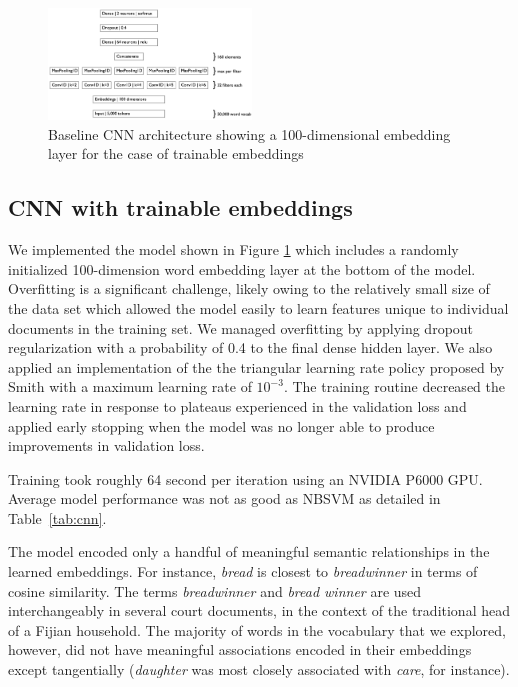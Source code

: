 \documentclass[twocolumn,10pt]{wmrDoc}
\begin{document}
\begin{figure}[h]
    \centering
    \includegraphics[width=0.48\textwidth]{images/CNN.png}
    \caption{Baseline CNN architecture showing a 100-dimensional embedding layer for the case of trainable embeddings}
    \label{fig:CNN}
\end{figure}

\subsection{CNN with trainable embeddings}
We implemented the model shown in Figure \ref{fig:CNN} which includes a randomly initialized 100-dimension word embedding layer at the bottom of the model.  Overfitting is a significant challenge, likely owing to the relatively small size of the data set which allowed the model easily to learn features unique to individual documents in the training set.  We managed overfitting by applying dropout regularization with a probability of 0.4 to the final dense hidden layer.  We also applied an implementation of the the triangular learning rate policy proposed by Smith \cite{smith2017} with a maximum learning rate of $10^{-3}$.  The training routine decreased the learning rate in response to plateaus experienced in the validation loss and applied early stopping when the model was no longer able to produce improvements in validation loss.

Training took roughly 64 second per iteration using an NVIDIA P6000 GPU.  Average model performance was not as good as NBSVM as detailed in Table~\ref{tab:cnn}.

The model encoded only a handful of meaningful semantic relationships in the learned embeddings.  For instance, \emph{bread} is closest to \emph{breadwinner} in terms of cosine similarity.  The terms \emph{breadwinner} and \emph{bread winner} are used interchangeably in several court documents, in the context of the traditional head of a Fijian household.  The majority of words in the vocabulary that we explored, however, did not have meaningful associations encoded in their embeddings except tangentially (\emph{daughter} was most closely associated with \emph{care}, for instance).
\end{document}
